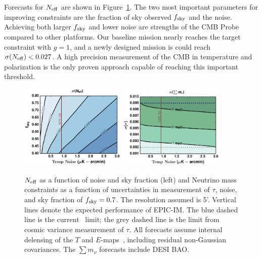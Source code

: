 Forecasts for ${N_{\rm eff}}$ are shown in Figure~\ref{fig:Neff_future}.  The two most important parameters for improving constraints
are the fraction of sky observed $f_{\rm sky}$ and the noise. Achieving both larger $f_{\rm sky}$ and
lower noise are strengths of the CMB Probe compared to other platforms. 
Our baseline mission nearly reaches the target constraint with $g=1$, and
a newly designed mission is could reach $\sigma({N_{\rm eff}}) < 0.027$.  A high precision measurement of the CMB in temperature and polarization is the only proven approach capable of reaching this important threshold.  

\begin{figure}[t!]
\begin{center}
\includegraphics[width=0.45\textwidth]{figs/Neff.pdf}
\includegraphics[width=0.45\textwidth]{figs/Mnu_tauprior.pdf}
\caption{ \small \setlength{\baselineskip}{0.95\baselineskip}
${N_{\rm eff}}$ as a function of noise and sky fraction (left) and
Neutrino mass constraints as a function of uncertainties in measurement of $\tau$, noise, and 
sky fraction of $f_{\rm sky} = 0.7$. The resolution assumed is 5'.  
Vertical lines denote the expected performance of EPIC-IM. 
The blue dashed line is the current \planck~limit; the grey dashed line is the limit from cosmic variance 
measurement of $\tau$. All forecasts assume internal delensing of the $T$ and $E$-maps~\cite{Green:2016cjr}, 
including residual non-Gaussian covariances.  The $\sum m_\nu$ forecasts include DESI BAO.  
\label{fig:Neff_future} }
\end{center}
\vspace{-0.15in}
\end{figure}

